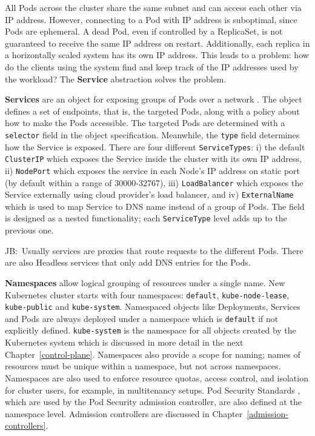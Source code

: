 \documentclass[english, 12pt, a4paper, sci, utf8, a-2b, online]{aaltothesis}
\newcommand{\mycomment}[3]{\textcolor{#1}{#2:~#3}}
\newcommand{\jb}[1]{\noindent\mycomment{aaltoRed}{JB}{#1}}
\begin{document}
All Pods across the cluster share the same subnet and can access each other via IP address.
However, connecting to a Pod with IP address is suboptimal, since Pods are ephemeral.
A dead Pod, even if controlled by a ReplicaSet, is not guaranteed to receive the same IP address on restart.
Additionally, each replica in a horizontally scaled system has its own IP address.
This leads to a problem: how do the clients using the system find and keep track of the IP addresses used by the workload? The \textbf{Service} abstraction solves the problem.

\textbf{Services} are an object for exposing groups of Pods over a network \cite{k8s-docs-services}.
The object defines a set of endpoints, that is, the targeted Pods, along with a policy about how to make the Pods accessible.
The targeted Pods are determined with a \texttt{selector} field in the object specification.
Meanwhile, the \texttt{type} field determines how the Service is exposed.
There are four different \texttt{ServiceTypes}: i) the default \texttt{ClusterIP} which exposes the Service inside the cluster with its own IP address, ii) \texttt{NodePort} which exposes the service in each Node's IP address on static port (by default within a range of 30000-32767), iii) \texttt{LoadBalancer} which exposes the Service externally using cloud provider's load balancer, and iv) \texttt{ExternalName} which is used to map Service to DNS name instead of a group of Pods.
The field is designed as a nested functionality; each \texttt{ServiceType} level adds up to the previous one.

\jb{Usually services are proxies that route requests to the different Pods. There are also Headless services that only add DNS entries for the Pods.}

\textbf{Namespaces} allow logical grouping of resources under a single name.
New Kubernetes cluster starts with four namespaces: \texttt{default}, \texttt{kube-node-lease}, \texttt{kube-public} and \texttt{kube-system}.
Namespaced objects like Deployments, Services and Pods are always deployed under a namespace which is \texttt{default} if not explicitly defined.
\texttt{kube-system} is the namespace for all objects created by the Kubernetes system which is discussed in more detail in the next Chapter~\ref{control-plane}.
Namespaces also provide a scope for naming; names of resources must be unique within a namespace, but not across namespaces.
Namespaces are also used to enforce resource quotas, access control, and isolation for cluster users, for example, in multitenancy setups.
Pod Security Standards \cite{k8s-docs-pss}, which are used by the Pod Security admission controller, are also defined at the namespace level.
Admission controllers are discussed in Chapter~\ref{admission-controllers}.
\end{document}
